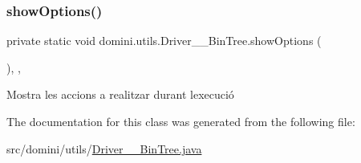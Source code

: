 \subsubsection{\texorpdfstring{show\+Options()}{showOptions()}}
{\footnotesize\ttfamily private static void domini.\+utils.\+Driver\+\_\+\+\_\+\+Bin\+Tree.\+show\+Options (\begin{DoxyParamCaption}{ }\end{DoxyParamCaption})\hspace{0.3cm}{\ttfamily [inline]}, {\ttfamily [static]}, {\ttfamily [private]}}



Mostra les accions a realitzar durant l\textquotesingle{}execució 



The documentation for this class was generated from the following file\+:\begin{DoxyCompactItemize}
\item 
src/domini/utils/\hyperlink{Driver____BinTree_8java}{Driver\+\_\+\+\_\+\+Bin\+Tree.\+java}\end{DoxyCompactItemize}
